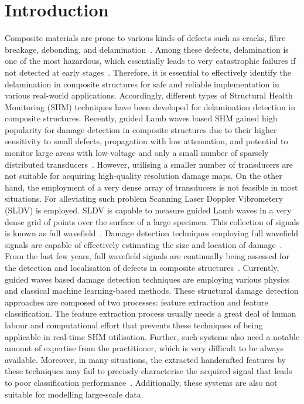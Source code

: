 \section{Introduction}
Composite materials are prone to various kinds of defects such as cracks, fibre breakage, debonding, and delamination~\cite{ip2004delamination, smith2009composite}. 
Among these defects, delamination is one of the most hazardous, which essentially leads to very catastrophic failures if not detected at early stages~\cite{valdes1999delamination}. 
Therefore, it is essential to effectively identify the delamination in composite structures for safe and reliable implementation in various real-world applications.  
Accordingly, different types of Structural Health Monitoring (SHM) techniques have been developed for delamination detection in composite structures. 
Recently, guided Lamb waves based SHM gained high popularity for damage detection in composite structures due to their higher sensitivity to small defects, propagation with low attenuation, and potential to monitor large areas with low-voltage and only a small number of sparsely distributed transducers~\cite{alleyne1992interaction, giurgiutiu2003lamb, Ihn2008, mitra2016guided}. 
However, utilising a smaller number of transducers are not suitable for acquiring high-quality resolution damage maps. 
On the other hand, the employment of a very dense array of transducers is not feasible in most situations. 
For alleviating such problem Scanning Laser Doppler Vibrometery (SLDV) is employed. 
SLDV is capable to measure guided Lamb waves in a very dense grid of points over the surface of a large specimen. 
This collection of signals is known as full wavefield~\cite{Radzienski2019a}. 
Damage detection techniques employing full wavefield signals are capable of effectively estimating the size and location of damage~\cite{Girolamo2018a, kudela2018impact}. 
From the last few years, full wavefield signals are continually being assessed for the detection and localisation of defects in composite structures~\cite{Radzienski2019a, kudela2018impact, sohn2011delamination, sohn2011automated, rogge2013characterization}.
Currently, guided waves based damage detection techniques are employing various physics and classical machine learning-based methods. 
These structural damage detection approaches are composed of two processes: feature extraction and feature classification. 
The feature extraction process usually needs a great deal of human labour and computational effort that prevents these techniques of being applicable in real-time SHM utilisation. 
Further, such systems also need a notable amount of expertise from the practitioner, which is very difficult to be always available.
Moreover, in many situations, the extracted handcrafted features by these techniques may fail to precisely characterise the acquired signal that leads to poor classification performance~\cite{Zhao2019b, Yuan2020}. 
Additionally, these systems are also not suitable for modelling large-scale data.
          
